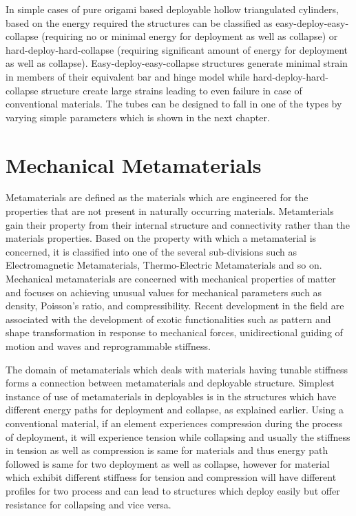 In simple cases of pure origami based deployable hollow triangulated cylinders, based on the energy required the structures can be classified as easy-deploy-easy-collapse (requiring no or minimal energy for deployment as well as collapse) or hard-deploy-hard-collapse (requiring significant amount of energy for deployment as well as collapse). Easy-deploy-easy-collapse structures generate minimal strain in members of their equivalent bar and hinge model while hard-deploy-hard-collapse structure create large strains leading to even failure in case of conventional materials\cite{Zha,FilipBarandHinge}. The tubes can be designed to fall in one of the types by varying simple parameters which is shown in the next chapter.

\section{Mechanical Metamaterials}
Metamaterials are defined as the materials which are engineered for the properties that are not present in naturally occurring materials. Metamterials gain their property from their internal structure and connectivity rather than the materials properties. Based on the property with which a metamaterial is concerned, it is classified into one of the several sub-divisions such as Electromagnetic Metamaterials, Thermo-Electric Metamaterials and so on. Mechanical metamaterials are concerned with mechanical properties of matter and focuses on achieving unusual values for mechanical parameters such as density, Poisson's ratio, and compressibility. Recent development in the field are associated with the development of exotic functionalities such as pattern and shape transformation in response to mechanical forces, unidirectional guiding of motion and waves and reprogrammable stiffness\cite{Berto, Surj}.

The domain of metamaterials which deals with materials having tunable stiffness forms a connection between metamaterials and deployable structure. Simplest instance of use of metamaterials in deployables is in the structures which have different energy paths for deployment and collapse, as explained earlier. Using a conventional material, if an element experiences compression during the process of deployment, it will experience tension while collapsing and usually the stiffness in tension as well as compression is same for materials and thus energy path followed is same for two deployment as well as collapse, however for material which exhibit different stiffness for tension and compression will have different profiles for two process and can lead to structures which deploy easily but offer resistance for collapsing and vice versa.\cite{Zha} 

